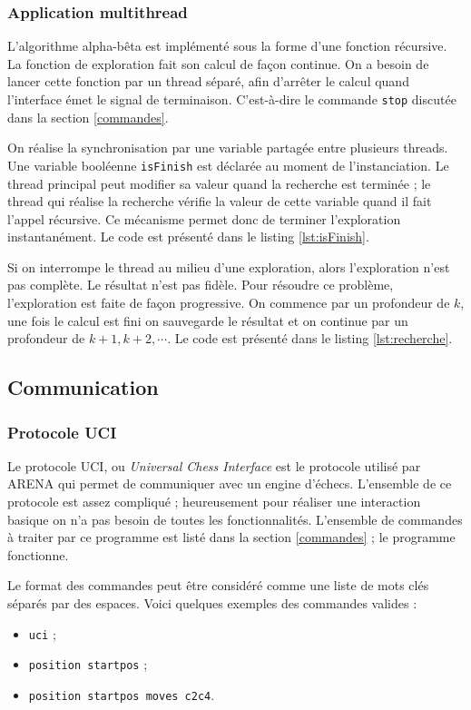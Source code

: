 \documentclass{article}
\begin{document}
\subsubsection{Application multithread}
\par L'algorithme alpha-bêta est implémenté sous la forme d'une fonction récursive. La fonction de exploration fait son calcul de façon continue. On a besoin de lancer cette fonction par un thread séparé, afin d'arrêter le calcul quand l'interface émet le signal de terminaison. C'est-à-dire le commande \texttt{stop} discutée dans la section \ref{commandes}.

\par On réalise la synchronisation par une variable partagée entre plusieurs threads. Une variable booléenne \texttt{isFinish} est déclarée au moment de l'instanciation. Le thread principal peut modifier sa valeur quand la recherche est terminée ; le thread qui réalise la recherche vérifie la valeur de cette variable quand il fait l'appel récursive. Ce mécanisme permet donc de terminer l'exploration instantanément. Le code est présenté dans le listing \ref{lst:isFinish}.

\par Si on interrompe le thread au milieu d'une exploration, alors l'exploration n'est pas complète. Le résultat n'est pas fidèle. Pour résoudre ce problème, l'exploration est faite de façon progressive. On commence par un profondeur de $k$, une fois le calcul est fini on sauvegarde le résultat et on continue par un profondeur de $k+1, k+2, \cdots$. Le code est présenté dans le listing \ref{lst:recherche}.

\subsection{Communication}
\subsubsection{Protocole UCI}
\par Le protocole UCI, ou \textit{Universal Chess Interface} est le protocole utilisé par ARENA qui permet de communiquer avec un engine d'échecs. L'ensemble de ce protocole est assez compliqué ; heureusement pour réaliser une interaction basique on n'a pas besoin de toutes les fonctionnalités. L'ensemble de commandes à traiter par ce programme est listé dans la section \ref{commandes} ; le programme fonctionne.

\par Le format des commandes peut être considéré comme une liste de mots clés séparés par des espaces. Voici quelques exemples des commandes valides :
\begin{itemize}
    \item \texttt{uci} ;
    \item \texttt{position startpos} ;
    \item \texttt{position startpos moves c2c4}.
\end{itemize}
\end{document}
